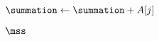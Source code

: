 
\begin{algorithm}[H]
  \begin{algorithmic}[1]
      \State {}

      \hStatex
        \State {}
          \State $\summation \gets \summation + A[j]$
          \State \red{$\mss \gets \max \set{\mss, \summation}$}
        \EndFor
      \EndFor

      \hStatex
      \State \Return $\mss$
    \EndProcedure
  \end{algorithmic}
\end{algorithm}